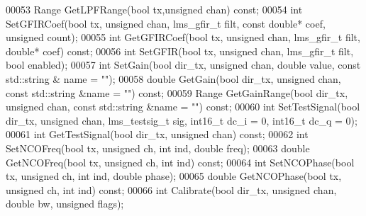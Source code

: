 \begin{DoxyCode}
00053     Range GetLPFRange(\textcolor{keywordtype}{bool} tx,\textcolor{keywordtype}{unsigned} chan) \textcolor{keyword}{const};
00054     \textcolor{keywordtype}{int} SetGFIRCoef(\textcolor{keywordtype}{bool} tx, \textcolor{keywordtype}{unsigned} chan, lms_gfir_t filt, \textcolor{keyword}{const} \textcolor{keywordtype}{double}* coef, \textcolor{keywordtype}{unsigned} 
      count);
00055     \textcolor{keywordtype}{int} GetGFIRCoef(\textcolor{keywordtype}{bool} tx, \textcolor{keywordtype}{unsigned} chan, lms_gfir_t filt, \textcolor{keywordtype}{double}* coef) \textcolor{keyword}{const};
00056     \textcolor{keywordtype}{int} SetGFIR(\textcolor{keywordtype}{bool} tx, \textcolor{keywordtype}{unsigned} chan, lms_gfir_t filt, \textcolor{keywordtype}{bool} enabled);
00057     \textcolor{keywordtype}{int} SetGain(\textcolor{keywordtype}{bool} dir_tx, \textcolor{keywordtype}{unsigned} chan, \textcolor{keywordtype}{double} value, \textcolor{keyword}{const} std::string &
      name = \textcolor{stringliteral}{""});
00058     \textcolor{keywordtype}{double} GetGain(\textcolor{keywordtype}{bool} dir_tx, \textcolor{keywordtype}{unsigned} chan, \textcolor{keyword}{const} std::string &name = \textcolor{stringliteral}{""}) \textcolor{keyword}{const};
00059     Range GetGainRange(\textcolor{keywordtype}{bool} dir_tx, \textcolor{keywordtype}{unsigned} chan, \textcolor{keyword}{const} std::string &name = \textcolor{stringliteral}{""}) \textcolor{keyword}{const};
00060     \textcolor{keywordtype}{int} SetTestSignal(\textcolor{keywordtype}{bool} dir_tx, \textcolor{keywordtype}{unsigned} chan, lms_testsig_t sig, int16\_t 
      dc_i = 0, int16\_t dc_q = 0);
00061     \textcolor{keywordtype}{int} GetTestSignal(\textcolor{keywordtype}{bool} dir_tx, \textcolor{keywordtype}{unsigned} chan) \textcolor{keyword}{const};
00062     \textcolor{keywordtype}{int} SetNCOFreq(\textcolor{keywordtype}{bool} tx, \textcolor{keywordtype}{unsigned} ch, \textcolor{keywordtype}{int} ind, \textcolor{keywordtype}{double} freq);
00063     \textcolor{keywordtype}{double} GetNCOFreq(\textcolor{keywordtype}{bool} tx, \textcolor{keywordtype}{unsigned} ch, \textcolor{keywordtype}{int} ind) \textcolor{keyword}{const};
00064     \textcolor{keywordtype}{int} SetNCOPhase(\textcolor{keywordtype}{bool} tx, \textcolor{keywordtype}{unsigned} ch, \textcolor{keywordtype}{int} ind, \textcolor{keywordtype}{double} phase);
00065     \textcolor{keywordtype}{double} GetNCOPhase(\textcolor{keywordtype}{bool} tx, \textcolor{keywordtype}{unsigned} ch, \textcolor{keywordtype}{int} ind) \textcolor{keyword}{const};
00066     \textcolor{keywordtype}{int} Calibrate(\textcolor{keywordtype}{bool} dir_tx, \textcolor{keywordtype}{unsigned} chan, \textcolor{keywordtype}{double} bw, \textcolor{keywordtype}{unsigned} flags);

\end{DoxyCode}
